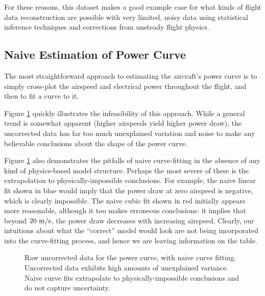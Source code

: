 \documentclass[conf]{new-aiaa}
\begin{document}
    For these reasons, this dataset makes a good example case for what kinds of flight data reconstruction are possible with very limited, noisy data using statistical inference techniques and corrections from unsteady flight physics.

    \subsection{Naive Estimation of Power Curve}

    The most straightforward approach to estimating the aircraft's power curve is to simply cross-plot the airspeed and electrical power throughout the flight, and then to fit a curve to it.

    Figure \ref{fig:power_curve_naive} quickly illustrates the infeasibility of this approach. While a general trend is somewhat apparent (higher airspeeds yield higher power draw), the uncorrected data has far too much unexplained variation and noise to make any believable conclusions about the shape of the power curve.

    Figure \ref{fig:power_curve_naive} also demonstrates the pitfalls of naive curve-fitting in the absence of any kind of physics-based model structure. Perhaps the most severe of these is the extrapolation to physically-impossible conclusions. For example, the naive linear fit shown in blue would imply that the power draw at zero airspeed is negative, which is clearly impossible. The naive cubic fit shown in red initially appears more reasonable, although it too makes erroneous conclusions: it implies that beyond $20\ \rm m/s$, the power draw decreases with increasing airspeed. Clearly, our intuitions about what the ``correct'' model would look are not being incorporated into the curve-fitting process, and hence we are leaving information on the table.

    \begin{figure}[H]
        \centering
        \caption{Raw uncorrected data for the power curve, with naive curve fitting. Uncorrected data exhibits high amounts of unexplained variance. Naive curve fits extrapolate to physically-impossible conclusions and do not capture uncertainty.}
        \label{fig:power_curve_naive}
    \end{figure}
\end{document}
